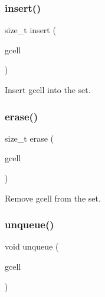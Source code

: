 \subsubsection{\texorpdfstring{insert()}{insert()}}
{\footnotesize\ttfamily size\+\_\+t insert (\begin{DoxyParamCaption}\item[{\mbox{\hyperlink{classKatabatic_1_1GCell}{G\+Cell}} $\ast$}]{gcell }\end{DoxyParamCaption})\hspace{0.3cm}{\ttfamily [inline]}}

Insert {\ttfamily gcell} into the set. \mbox{\label{classKatabatic_1_1GCellDensitySet_a743f7f98fe31b8a1c134aff01ba03acb}} 
\subsubsection{\texorpdfstring{erase()}{erase()}}
{\footnotesize\ttfamily size\+\_\+t erase (\begin{DoxyParamCaption}\item[{\mbox{\hyperlink{classKatabatic_1_1GCell}{G\+Cell}} $\ast$}]{gcell }\end{DoxyParamCaption})\hspace{0.3cm}{\ttfamily [inline]}}

Remove {\ttfamily gcell} from the set. \mbox{\label{classKatabatic_1_1GCellDensitySet_a89099ec88eadcadb942b7d64a6ffd7ee}} 
\subsubsection{\texorpdfstring{unqueue()}{unqueue()}}
{\footnotesize\ttfamily void unqueue (\begin{DoxyParamCaption}\item[{\mbox{\hyperlink{classKatabatic_1_1GCell}{G\+Cell}} $\ast$}]{gcell }\end{DoxyParamCaption})\hspace{0.3cm}{\ttfamily [inline]}}

